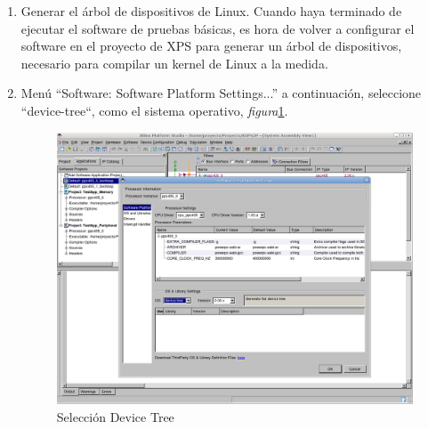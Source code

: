 \begin{enumerate}
\item Generar el árbol de dispositivos de Linux. Cuando haya terminado de
ejecutar el software de pruebas básicas, es hora de volver a configurar el
software en el proyecto de XPS para generar un árbol de dispositivos, necesario
para compilar un kernel de Linux a la medida. 

\item   Menú ``Software: Software Platform Settings...'' a
continuación, seleccione ``device-tree``, como el sistema operativo,
\emph{figura}\ref{devicetree}.
  \begin{figure}[h!] 
  \centering
  \includegraphics[scale=.25]{./figuras/devicetree.png}
  \caption{Selección Device Tree}
  \label{devicetree}
  \end{figure}
  

\end{enumerate}
